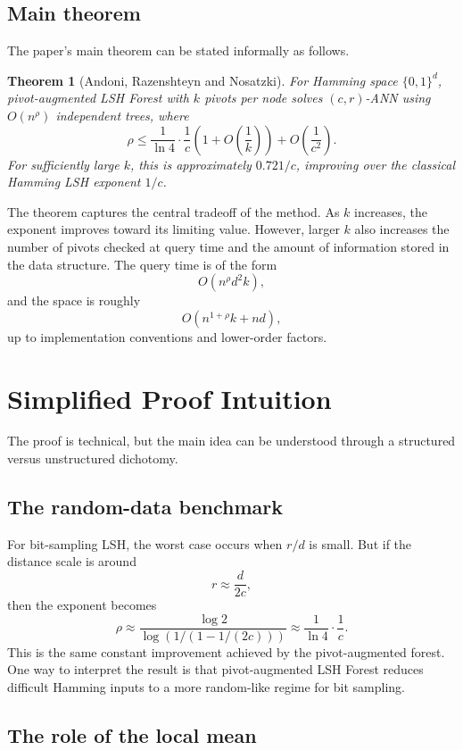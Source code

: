 \documentclass[11pt]{article}
\newtheorem{theorem}{Theorem}
\begin{document}
\subsection{Main theorem}

The paper's main theorem can be stated informally as follows.

\begin{theorem}[Andoni, Razenshteyn and Nosatzki]
For Hamming space $\{0,1\}^d$, pivot-augmented LSH Forest with $k$ pivots per node solves $(c,r)$-ANN using $O(n^\rho)$ independent trees, where
\[
    \rho \le \frac{1}{\ln 4}\cdot \frac{1}{c}\left(1+O\left(\frac{1}{k}\right)\right)+O\left(\frac{1}{c^2}\right).
\]
For sufficiently large $k$, this is approximately $0.721/c$, improving over the classical Hamming LSH exponent $1/c$.
\end{theorem}

The theorem captures the central tradeoff of the method. As $k$ increases, the exponent improves toward its limiting value. However, larger $k$ also increases the number of pivots checked at query time and the amount of information stored in the data structure. The query time is of the form
\[
    O(n^\rho d^2 k),
\]
and the space is roughly
\[
    O(n^{1+\rho}k + nd),
\]
up to implementation conventions and lower-order factors.

\section{Simplified Proof Intuition}

The proof is technical, but the main idea can be understood through a structured versus unstructured dichotomy.

\subsection{The random-data benchmark}

For bit-sampling LSH, the worst case occurs when $r/d$ is small. But if the distance scale is around
\[
    r \approx \frac{d}{2c},
\]
then the exponent becomes
\[
    \rho \approx \frac{\log 2}{\log(1/(1-1/(2c)))} \approx \frac{1}{\ln 4}\cdot \frac{1}{c}.
\]
This is the same constant improvement achieved by the pivot-augmented forest. One way to interpret the result is that pivot-augmented LSH Forest reduces difficult Hamming inputs to a more random-like regime for bit sampling.

\subsection{The role of the local mean}
\end{document}
